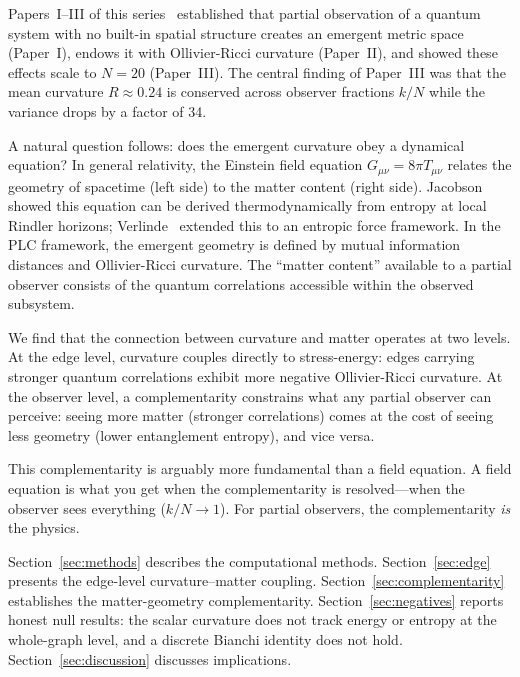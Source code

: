 \documentclass[aps,pra,twocolumn,superscriptaddress,floatfix]{revtex4-2}
\begin{document}
Papers~I--III of this series~\cite{glass2026plc1,glass2026plc2,glass2026plc3}
established that partial observation of a quantum system with no
built-in spatial structure creates an emergent metric space
(Paper~I), endows it with Ollivier-Ricci curvature (Paper~II),
and showed these effects scale to $N = 20$ (Paper~III).
The central finding of Paper~III was that the mean curvature
$R \approx 0.24$ is conserved across observer fractions $k/N$
while the variance drops by a factor of 34.

A natural question follows: does the emergent curvature obey
a dynamical equation?  In general relativity, the Einstein
field equation $G_{\mu\nu} = 8\pi T_{\mu\nu}$ relates the
geometry of spacetime (left side) to the matter content
(right side).  Jacobson~\cite{jacobson1995} showed this
equation can be derived thermodynamically from entropy
at local Rindler horizons; Verlinde~\cite{verlinde2011}
extended this to an entropic force framework.  In the PLC framework, the emergent geometry
is defined by mutual information distances and Ollivier-Ricci
curvature.  The ``matter content'' available to a partial
observer consists of the quantum correlations accessible
within the observed subsystem.

We find that the connection between curvature and matter
operates at two levels.  At the edge level, curvature couples
directly to stress-energy: edges carrying stronger quantum
correlations exhibit more negative Ollivier-Ricci curvature.
At the observer level, a complementarity constrains what
any partial observer can perceive: seeing more matter
(stronger correlations) comes at the cost of seeing less
geometry (lower entanglement entropy), and vice versa.

This complementarity is arguably more fundamental than a
field equation.  A field equation is what you get when the
complementarity is resolved---when the observer sees
everything ($k/N \to 1$).  For partial observers, the
complementarity \emph{is} the physics.

Section~\ref{sec:methods} describes the computational methods.
Section~\ref{sec:edge} presents the edge-level curvature--matter
coupling.
Section~\ref{sec:complementarity} establishes the matter-geometry
complementarity.
Section~\ref{sec:negatives} reports honest null results: the
scalar curvature does not track energy or entropy at the
whole-graph level, and a discrete Bianchi identity does not hold.
Section~\ref{sec:discussion} discusses implications.

\end{document}
